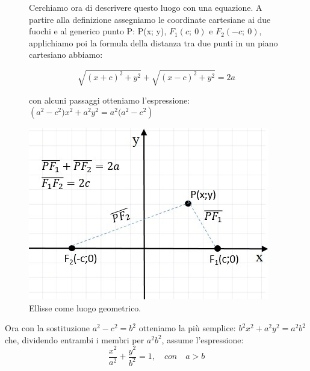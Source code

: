 \begin{figure}[h]
\noindent\begin{minipage}{.50\textwidth}
Cerchiamo ora di descrivere questo luogo con una equazione. A partire alla 
definizione assegniamo le coordinate cartesiane ai due fuochi e al generico 
punto P: P(x; y), $ F_{1}(c;~0)$ e $ F_{2} (-c;~0)$, applichiamo poi la 
formula della distanza tra due punti in un piano cartesiano abbiamo:

\[\sqrt{(x+c)^{2}+y^{2}}+\sqrt{(x-c)^{2}+y^{2}}=2a\] 

con alcuni passaggi otteniamo l'espressione:
$\left( a^{2}-c^{2})x^{2}+a^{2}y^{2}=a^{2}(a^{2}-c^{2}\right)$
\end{minipage}
\hfill
\begin{minipage}{.48\textwidth}
\begin{center}
  \includegraphics[width=.9\textwidth]{img/PF1F2.jpg}
  \caption{Ellisse come luogo geometrico.}
\end{center}
\end{minipage} 
\end{figure}

Ora con la sostituzione $a^{2}-c^{2}=b^{2}$ otteniamo la più semplice:  
$b^{2}x^{2}+a^{2}y^{2}=a^{2}b^{2}$ che, dividendo entrambi i membri per 
$a^{2}b^{2}$, assume l'espressione:
\begin{equation}
\dfrac{x^{2}}{a^{2}}+\dfrac{y^{2}}{b^{2}}=1, \quad con  \quad a>b
\end{equation}


